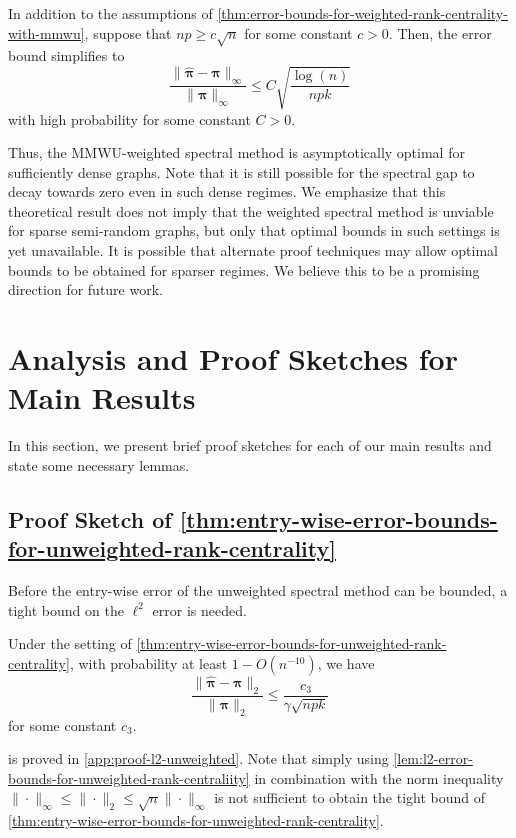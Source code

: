 \documentclass[sigconf,nonacm,pbalance]{acmart}
\begin{document}
\begin{corollary}\label{cor:error-bounds-mmwu-dense}
In addition to the assumptions of \cref{thm:error-bounds-for-weighted-rank-centrality-with-mmwu}, suppose that $np \geq c\sqrt{n}$ for some constant $c>0$. Then, the error bound simplifies to
\begin{equation}
\frac{\|\hat{\bm{\pi}}-\bm{\pi}\|_\infty}{\|\bm{\pi}\|_\infty} \leq C \sqrt{\frac{\log(n)}{npk}} 
\end{equation}
with high probability for some constant $C>0$.
\end{corollary}

Thus, the MMWU-weighted spectral method is asymptotically optimal for sufficiently dense graphs. Note that it is still possible for the spectral gap to decay towards zero even in such dense regimes. We emphasize that this theoretical result does not imply that the weighted spectral method is unviable for sparse semi-random graphs, but only that optimal bounds in such settings is yet unavailable. It is possible that alternate proof techniques may allow optimal bounds to be obtained for sparser regimes. We believe this to be a promising direction for future work.

\section{Analysis and Proof Sketches for Main Results}
In this section, we present brief proof sketches for each of our main results and state some necessary lemmas.
\subsection{Proof Sketch of \cref{thm:entry-wise-error-bounds-for-unweighted-rank-centrality}}\label{sec:proof-sketch-unweighted}
Before the entry-wise error of the unweighted spectral method can be bounded, a tight bound on the $\ell^2$ error is needed.
\begin{lemma}\label{lem:l2-error-bounds-for-unweighted-rank-centraliity}
Under the setting of \cref{thm:entry-wise-error-bounds-for-unweighted-rank-centrality}, with probability at least $1-O(n^{-10})$, we have
\begin{equation}
    \frac{\|\hat{\bm{\pi}}-\bm{\pi}\|_2}{\|\bm{\pi}\|_2} \leq \frac{c_3}{\gamma\sqrt{npk}}
\end{equation}
for some constant $c_3$.
\end{lemma}
 is proved in \cref{app:proof-l2-unweighted}. Note that simply using \cref{lem:l2-error-bounds-for-unweighted-rank-centraliity} in combination with the norm inequality $\|\cdot\|_\infty \leq \|\cdot\|_2 \leq \sqrt{n}\|\cdot\|_\infty$ is not sufficient to obtain the tight bound of \cref{thm:entry-wise-error-bounds-for-unweighted-rank-centrality}.
\end{document}
